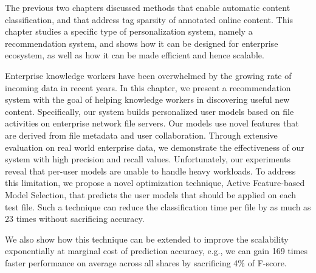 The previous two chapters discussed methods that enable automatic content classification, and that address tag sparsity of annotated online content. This chapter studies a specific type of personalization system, namely a recommendation system, and shows how it can be designed for enterprise ecosystem, as well as how it can be made efficient and hence scalable. 


  Enterprise knowledge workers have been overwhelmed by the growing
  rate of incoming data in recent years.  In this chapter, we present a
  recommendation system with the goal of helping knowledge workers in
  discovering useful new content.  Specifically, our system builds
  personalized user models based on file activities on enterprise
  network file servers.  Our models use novel features that are
  derived from file metadata and user collaboration.  Through
  extensive evaluation on real world enterprise data, we demonstrate
  the effectiveness of our system with high precision and recall
  values.  Unfortunately, our experiments reveal that per-user models
  are unable to handle heavy workloads.  To address this
  limitation, we propose a novel optimization technique, Active
  Feature-based Model Selection, that predicts the user models that 
should be applied on each test file. Such a technique can reduce the 
classification time per file by as much as 23 times without sacrificing accuracy. 

  We also show how this technique can be extended to improve the
  scalability exponentially at marginal cost of prediction accuracy, e.g., we can 
 gain 169 times faster performance on average across all shares by sacrificing 4\%
  of F-score.



 

 
% 



